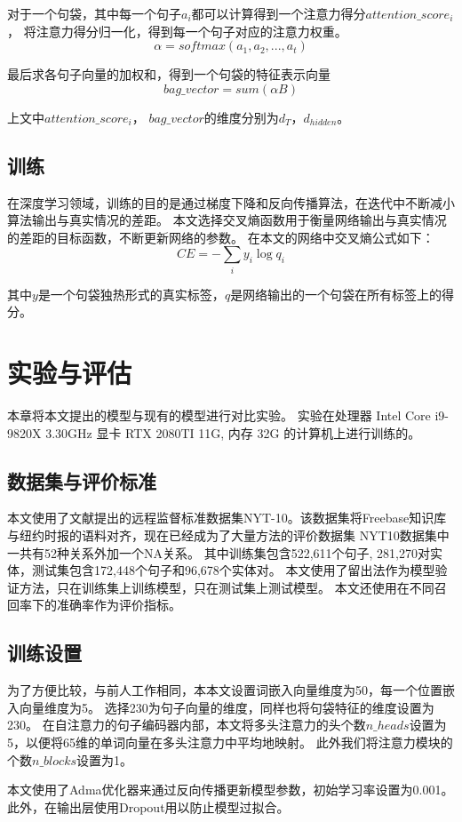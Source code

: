 \documentclass[UTF8]{csoarticle}
\begin{document}
对于一个句袋，其中每一个句子$a_i$都可以计算得到一个注意力得分$attention\_score_i$，
将注意力得分归一化，得到每一个句子对应的注意力权重。
\[\alpha = softmax({a_1,a_2,...,a_t})\]

最后求各句子向量的加权和，得到一个句袋的特征表示向量
\[bag\_vector = sum(\alpha  B)\]

上文中$attention\_score_i$， $bag\_vector$的维度分别为$d_T$，$d_{hidden}$。

\subsection{训练}
在深度学习领域，训练的目的是通过梯度下降和反向传播算法，在迭代中不断减小算法输出与真实情况的差距。
本文选择交叉熵函数用于衡量网络输出与真实情况的差距的目标函数，不断更新网络的参数。
在本文的网络中交叉熵公式如下：
\[ CE =-\sum _{i}y_i \log q_i\]

其中$y$是一个句袋独热形式的真实标签，$q$是网络输出的一个句袋在所有标签上的得分。
\section{实验与评估}
本章将本文提出的模型与现有的模型进行对比实验。
实验在处理器 Intel Core i9-9820X 3.30GHz 显卡 RTX 2080TI 11G, 内存 32G 的计算机上进行训练的。

\subsection{数据集与评价标准}
本文使用了文献\cite{bib2}提出的远程监督标准数据集NYT-10。该数据集将Freebase知识库与纽约时报的语料对齐，现在已经成为了大量方法的评价数据集
NYT10数据集中一共有52种关系外加一个NA关系。
其中训练集包含522,611个句子, 281,270对实体，测试集包含172,448个句子和96,678个实体对。
本文使用了留出法作为模型验证方法，只在训练集上训练模型，只在测试集上测试模型。
本文还使用在不同召回率下的准确率作为评价指标。

\subsection{训练设置}
为了方便比较，与前人工作相同，本本文设置词嵌入向量维度为50，每一个位置嵌入向量维度为5。
选择230为句子向量的维度，同样也将句袋特征的维度设置为230。
在自注意力的句子编码器内部，本文将多头注意力的头个数$n\_heads$设置为5，以便将65维的单词向量在多头注意力中平均地映射。
此外我们将注意力模块的个数$n\_blocks$设置为1。

本文使用了Adma优化器来通过反向传播更新模型参数，初始学习率设置为0.001。此外，在输出层使用Dropout用以防止模型过拟合。
\end{document}
